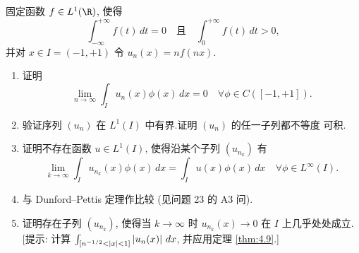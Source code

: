 \begin{exercise}
\label{exer:4.37}
固定函数 $f\in L^1(\R)$, 使得
\begin{equation*}
\int_{-\infty}^{+\infty}f(t)\,dt=0\quad\text{且}\quad
\int_0^{+\infty}f(t)\,dt>0,
\end{equation*}
并对 $x\in I=(-1,+1)$ 令 $u_n(x)=nf(nx)$.
\begin{enumerate}[label=\arabic*., leftmargin=2.2em, itemsep=0.35em]
	\item 证明
	      \begin{equation*}
	      \lim_{n\to\infty}\int_Iu_n(x)\phi(x)\,dx=0\quad
	      \forall\phi\in C([-1,+1]).
	      \end{equation*}
	\item 验证序列 $(u_n)$ 在 $L^1(I)$ 中有界.证明 $(u_n)$ 的任一子列都不等度
	      可积.
	\item 证明不存在函数 $u\in L^1(I)$, 使得沿某个子列 $(u_{n_k})$ 有
	      \begin{equation*}
	      \lim_{k\to\infty}\int_Iu_{n_k}(x)\phi(x)\,dx
	      =\int_Iu(x)\phi(x)\,dx\quad\forall\phi\in L^\infty(I).
	      \end{equation*}
	\item 与 Dunford--Pettis 定理作比较 (见问题 23 的 A3 问).
	\item 证明存在子列 $(u_{n_k})$, 使得当 $k\to\infty$ 时 $u_{n_k}(x)\to0$
	      在 $I$ 上几乎处处成立.
	      [提示: 计算 $\int_{[n^{-1/2}<\left|x\right|<1]}\left|u_n(x)\right|\,dx$, 并应用定理
	       \ref{thm:4.9}.]
\end{enumerate}
\end{exercise}

